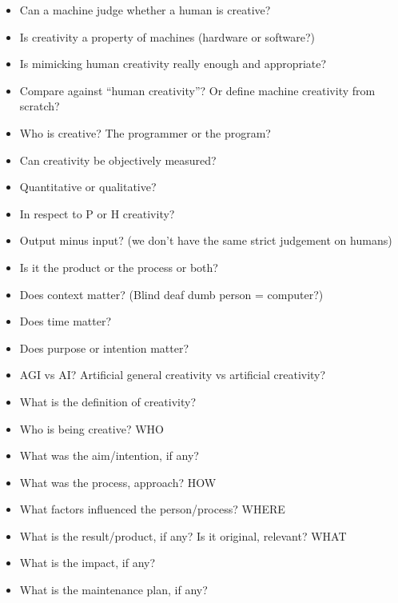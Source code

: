 \begin{itemize}
  \item Can a machine judge whether a human is creative?
  \item Is creativity a property of machines (hardware or software?)
  \item Is mimicking human creativity really enough and appropriate?
  \item Compare against ``human creativity''? Or define machine creativity from scratch?
  \item Who is creative? The programmer or the program?
  \item Can creativity be objectively measured?
  \item Quantitative or qualitative?
  \item In respect to P or H creativity?
  \item Output minus input? (we don’t have the same strict judgement on humans)
  \item Is it the product or the process or both?
  \item Does context matter? (Blind deaf dumb person = computer?)
  \item Does time matter?
  \item Does purpose or intention matter?
  \item AGI vs AI? Artificial general creativity vs artificial creativity?
  \item What is the definition of creativity?
  \item Who is being creative? WHO
  \item What was the aim/intention, if any?
  \item What was the process, approach? HOW
  \item What factors influenced the person/process? WHERE
  \item What is the result/product, if any? Is it original, relevant? WHAT
  \item What is the impact, if any?
  \item What is the maintenance plan, if any?
\end{itemize}


